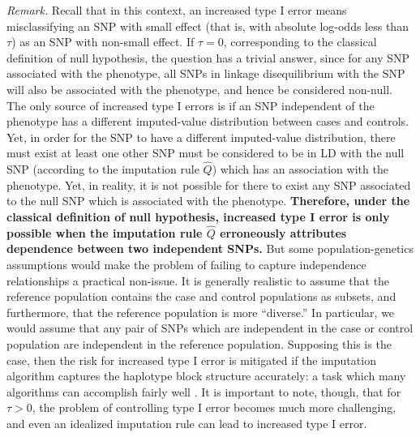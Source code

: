 \documentclass[12pt]{article}
\begin{document}
\emph{Remark.}
Recall that in this context, an increased type I error
means misclassifying an SNP with small effect (that is,
with absolute log-odds less than $\tau$)
as an SNP with non-small effect.
If $\tau=0$, corresponding to the classical definition of null
hypothesis,
the question has a trivial answer,
since for any SNP associated with the phenotype,
all SNPs in linkage disequilibrium with the SNP will also
be associated with the phenotype, and hence be considered non-null.
The only source of increased type I errors is if an
SNP independent of the phenotype has a different imputed-value
distribution
between cases and controls.
Yet, in order for the SNP to have a different imputed-value
distribution,
there must exist at least one other SNP must be considered to be in LD
with the null SNP (according to the imputation rule $\hat{Q}$) which has an association with the phenotype.
Yet, in reality, it is not possible for there to exist any SNP
associated
to the null SNP which is associated with the phenotype.
\textbf{Therefore, under the classical definition of null hypothesis,
increased type I error is only possible when the imputation
rule $\hat{Q}$ erroneously attributes dependence between two independent SNPs.}
But some population-genetics assumptions would make the
problem of failing to capture independence relationships a practical non-issue.
It is generally realistic to assume that the reference population
contains the case and control populations as subsets,
and furthermore, that the reference population is more ``diverse.''
In particular, we would assume that any pair of SNPs which are
independent
in the case or control population are independent in the reference
population.
Supposing this is the case, then the risk for increased type I error
is mitigated if the imputation algorithm captures the
haplotype block structure accurately: a task which many algorithms
can accomplish fairly well \cite{Stephens2005}.
It is important to note, though, that for $\tau > 0$,
the problem of controlling type I error becomes much more challenging,
and even an idealized imputation rule
can lead to increased type I error.
\end{document}
